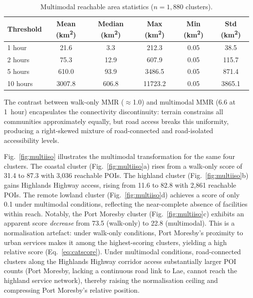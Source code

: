 \documentclass[review,3p,authoryear]{elsarticle}
\begin{document}
\begin{table}[!h]
\centering
\caption{Multimodal reachable area statistics ($n = 1{,}880$ clusters).}
\label{tab:multiarea}
\begin{tabular}{@{}lS[table-format=4.1]S[table-format=3.1]S[table-format=5.1]S[table-format=1.2]S[table-format=4.1]@{}}
\toprule
Threshold & {Mean (\si{\kilo\metre\squared})} & {Median (\si{\kilo\metre\squared})} & {Max (\si{\kilo\metre\squared})} & {Min (\si{\kilo\metre\squared})} & {Std (\si{\kilo\metre\squared})} \\
 hour   & 21.6   & 3.3    & 212.3    & 0.05 & 38.5  \\
2 hours  & 75.3   & 12.9   & 607.9    & 0.05 & 115.7 \\
5 hours  & 610.0  & 93.9   & 3486.5   & 0.05 & 871.4 \\
10 hours & 3007.8 & 606.8  & 11723.2  & 0.05 & 3865.1 \\
\bottomrule
\end{tabular}
\end{table}

The contrast between walk-only MMR ($\approx$1.0) and multimodal MMR (6.6 at 1~hour) encapsulates the connectivity discontinuity: terrain constrains all communities approximately equally, but road access breaks this uniformity, producing a right-skewed mixture of road-connected and road-isolated accessibility levels.

Fig.~\ref{fig:multiiso} illustrates the multimodal transformation for the same four clusters. The coastal cluster (Fig.~\ref{fig:multiiso}a) rises from a walk-only score of 31.4 to 87.3 with 3,036 reachable POIs. The highland cluster (Fig.~\ref{fig:multiiso}b) gains Highlands Highway access, rising from 11.6 to 82.8 with 2,861 reachable POIs. The remote lowland cluster (Fig.~\ref{fig:multiiso}d) achieves a score of only 0.1 under multimodal conditions, reflecting the near-complete absence of facilities within reach. Notably, the Port Moresby cluster (Fig.~\ref{fig:multiiso}c) exhibits an apparent score \textit{decrease} from 73.5 (walk-only) to 22.8 (multimodal). This is a normalisation artefact: under walk-only conditions, Port Moresby's proximity to urban services makes it among the highest-scoring clusters, yielding a high relative score (Eq.~\ref{eq:catscore}). Under multimodal conditions, road-connected clusters along the Highlands Highway corridor access substantially larger POI counts (Port Moresby, lacking a continuous road link to Lae, cannot reach the highland service network), thereby raising the normalisation ceiling and compressing Port Moresby's relative position.
\end{document}
